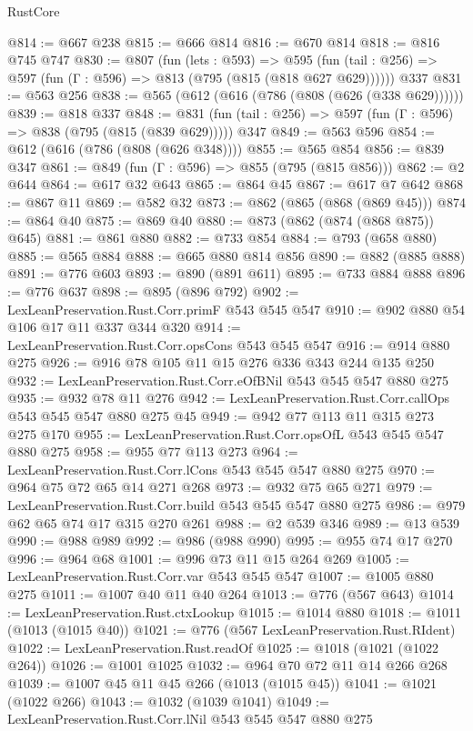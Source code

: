 \begin{lexlean}{RustCore}
\begin{coremodule}
@814 := @667 @238
@815 := @666 @814
@816 := @670 @814
@818 := @816 @745 @747
@830 := @807
    (fun (lets : @593) =>
    @595 (fun (tail : @256) => @597 (fun (Γ : @596) => @813 (@795 (@815 (@818 @627 @629))))))
    @337
@831 := @563 @256
@838 := @565 (@612 (@616 (@786 (@808 (@626 (@338 @629))))))
@839 := @818 @337
@848 := @831 (fun (tail : @256) => @597 (fun (Γ : @596) => @838 (@795 (@815 (@839 @629))))) @347
@849 := @563 @596
@854 := @612 (@616 (@786 (@808 (@626 @348))))
@855 := @565 @854
@856 := @839 @347
@861 := @849 (fun (Γ : @596) => @855 (@795 (@815 @856)))
@862 := @2 @644
@864 := @617 @32 @643
@865 := @864 @45
@867 := @617 @7 @642
@868 := @867 @11
@869 := @582 @32
@873 := @862 (@865 (@868 (@869 @45)))
@874 := @864 @40
@875 := @869 @40
@880 := @873 (@862 (@874 (@868 @875)) @645)
@881 := @861 @880
@882 := @733 @854
@884 := @793 (@658 @880)
@885 := @565 @884
@888 := @665 @880 @814 @856
@890 := @882 (@885 @888)
@891 := @776 @603
@893 := @890 (@891 @611)
@895 := @733 @884 @888
@896 := @776 @637
@898 := @895 (@896 @792)
@902 := LexLeanPreservation.Rust.Corr.primF @543 @545 @547
@910 := @902 @880 @54 @106 @17 @11 @337 @344 @320
@914 := LexLeanPreservation.Rust.Corr.opsCons @543 @545 @547
@916 := @914 @880 @275
@926 := @916 @78 @105 @11 @15 @276 @336 @343 @244 @135 @250
@932 := LexLeanPreservation.Rust.Corr.eOfBNil @543 @545 @547 @880 @275
@935 := @932 @78 @11 @276
@942 := LexLeanPreservation.Rust.Corr.callOps @543 @545 @547 @880 @275 @45
@949 := @942 @77 @113 @11 @315 @273 @275 @170
@955 := LexLeanPreservation.Rust.Corr.opsOfL @543 @545 @547 @880 @275
@958 := @955 @77 @113 @273
@964 := LexLeanPreservation.Rust.Corr.lCons @543 @545 @547 @880 @275
@970 := @964 @75 @72 @65 @14 @271 @268
@973 := @932 @75 @65 @271
@979 := LexLeanPreservation.Rust.Corr.build @543 @545 @547 @880 @275
@986 := @979 @62 @65 @74 @17 @315 @270 @261
@988 := @2 @539 @346
@989 := @13 @539
@990 := @988 @989
@992 := @986 (@988 @990)
@995 := @955 @74 @17 @270
@996 := @964 @68
@1001 := @996 @73 @11 @15 @264 @269
@1005 := LexLeanPreservation.Rust.Corr.var @543 @545 @547
@1007 := @1005 @880 @275
@1011 := @1007 @40 @11 @40 @264
@1013 := @776 (@567 @643)
@1014 := LexLeanPreservation.Rust.ctxLookup
@1015 := @1014 @880
@1018 := @1011 (@1013 (@1015 @40))
@1021 := @776 (@567 LexLeanPreservation.Rust.RIdent)
@1022 := LexLeanPreservation.Rust.readOf
@1025 := @1018 (@1021 (@1022 @264))
@1026 := @1001 @1025
@1032 := @964 @70 @72 @11 @14 @266 @268
@1039 := @1007 @45 @11 @45 @266 (@1013 (@1015 @45))
@1041 := @1021 (@1022 @266)
@1043 := @1032 (@1039 @1041)
@1049 := LexLeanPreservation.Rust.Corr.lNil @543 @545 @547 @880 @275

\end{coremodule}
\end{lexlean}
